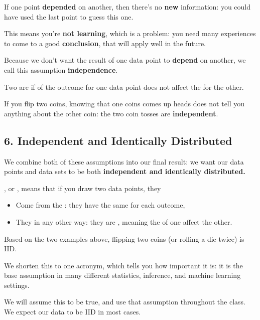         If one point \textbf{depended} on another, then there's no \textbf{new} information: you could have used the last point to guess this one.
        
        This means you're \textbf{not learning}, which is a problem: you need many experiences to come to a good \textbf{conclusion}, that will apply well in the future.
        
        Because we don't want the result of one data point to \textbf{depend} on another, we call this assumption \textbf{independence}.\\
        
        \begin{definition}
            Two  are  if  of the outcome for one data point does not affect the  for the other.
        \end{definition}
        
        
        \miniex If you flip two coins, knowing that one coins comes up heads does not tell you anything about the other coin: the two coin tosses are \textbf{independent}.
        
\pagebreak
        
    \subsection*{6. Independent and Identically Distributed}
    
        We combine both of these assumptions into our final result: we want our data points and data sets to be both \textbf{independent and identically distributed.}\\
        
        \begin{definition}
            , or , means that if you draw two data points, they
            
            \begin{itemize}
                \item Come from the  : they have the same  for each outcome,
                \item They  in any other way: they are , meaning the  of one  affect the other.
            \end{itemize}
        \end{definition}
        
        \miniex Based on the two examples above, flipping two coins (or rolling a die twice) is IID.
            
        We shorten this to one acronym, which tells you how important it is: it is the base assumption in many different statistics, inference, and machine learning settings.
        
        We will assume this to be true, and use that assumption throughout the class. We expect our data to be IID in most cases.